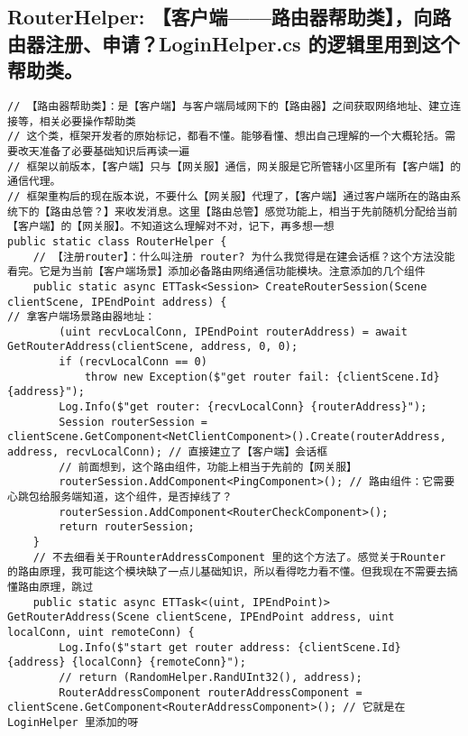 \documentclass[9pt, b5paper]{article}
\begin{document}
\subsection{RouterHelper: 【客户端——路由器帮助类】，向路由器注册、申请？LoginHelper.cs 的逻辑里用到这个帮助类。}
\label{sec-6-5}
\begin{verbatim}
// 【路由器帮助类】：是【客户端】与客户端局域网下的【路由器】之间获取网络地址、建立连接等，相关必要操作帮助类
// 这个类，框架开发者的原始标记，都看不懂。能够看懂、想出自己理解的一个大概轮括。需要改天准备了必要基础知识后再读一遍
// 框架以前版本，【客户端】只与【网关服】通信，网关服是它所管辖小区里所有【客户端】的通信代理。
// 框架重构后的现在版本说，不要什么【网关服】代理了，【客户端】通过客户端所在的路由系统下的【路由总管？】来收发消息。这里【路由总管】感觉功能上，相当于先前随机分配给当前【客户端】的【网关服】。不知道这么理解对不对，记下，再多想一想
public static class RouterHelper {
    // 【注册router】：什么叫注册 router? 为什么我觉得是在建会话框？这个方法没能看完。它是为当前【客户端场景】添加必备路由网络通信功能模块。注意添加的几个组件
    public static async ETTask<Session> CreateRouterSession(Scene clientScene, IPEndPoint address) {
// 拿客户端场景路由器地址：
        (uint recvLocalConn, IPEndPoint routerAddress) = await GetRouterAddress(clientScene, address, 0, 0); 
        if (recvLocalConn == 0) 
            throw new Exception($"get router fail: {clientScene.Id} {address}");
        Log.Info($"get router: {recvLocalConn} {routerAddress}");
        Session routerSession = clientScene.GetComponent<NetClientComponent>().Create(routerAddress, address, recvLocalConn); // 直接建立了【客户端】会话框
        // 前面想到，这个路由组件，功能上相当于先前的【网关服】
        routerSession.AddComponent<PingComponent>(); // 路由组件：它需要心跳包给服务端知道，这个组件，是否掉线了？
        routerSession.AddComponent<RouterCheckComponent>(); 
        return routerSession;
    }
    // 不去细看关于RounterAddressComponent 里的这个方法了。感觉关于Rounter 的路由原理，我可能这个模块缺了一点儿基础知识，所以看得吃力看不懂。但我现在不需要去搞懂路由原理，跳过
    public static async ETTask<(uint, IPEndPoint)> GetRouterAddress(Scene clientScene, IPEndPoint address, uint localConn, uint remoteConn) {
        Log.Info($"start get router address: {clientScene.Id} {address} {localConn} {remoteConn}");
        // return (RandomHelper.RandUInt32(), address);
        RouterAddressComponent routerAddressComponent = clientScene.GetComponent<RouterAddressComponent>(); // 它就是在 LoginHelper 里添加的呀

\end{verbatim}
\end{document}
